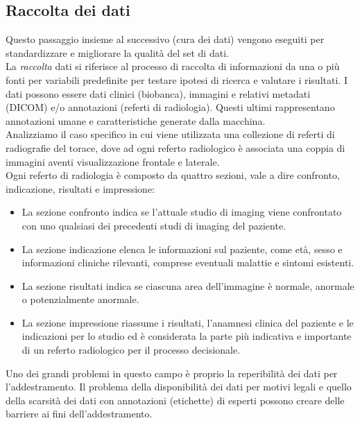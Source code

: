 \documentclass[12pt,a4paper]{report}
\begin{document}
\subsection{Raccolta dei dati}
Questo passaggio insieme al successivo (cura dei dati) vengono eseguiti per standardizzare e migliorare la qualità del set di dati.\\
La \emph{raccolta} dati si riferisce al processo di raccolta di informazioni da una o più fonti per variabili predefinite per testare ipotesi di ricerca e valutare i risultati. 
I dati possono essere dati clinici (biobanca), immagini e relativi metadati (DICOM) e/o annotazioni (referti di radiologia). Questi ultimi rappresentano annotazioni umane e caratteristiche generate dalla macchina.\\
Analizziamo il caso specifico in cui viene utilizzata una collezione di referti di radiografie del torace, dove ad ogni referto radiologico è associata una coppia di immagini aventi visualizzazione frontale e laterale.\\
Ogni referto di radiologia è composto da quattro sezioni, vale a dire confronto, indicazione, risultati e impressione:
\begin{itemize}
    \item La sezione confronto indica se l'attuale studio di imaging viene confrontato con uno qualsiasi dei precedenti studi di imaging del paziente.
    \item La sezione indicazione elenca le informazioni sul paziente, come età, sesso e informazioni cliniche rilevanti, comprese eventuali malattie e sintomi esistenti.
    \item La sezione risultati indica se ciascuna area dell'immagine è normale, anormale o potenzialmente anormale.
    \item La sezione impressione riassume i risultati, l'anamnesi clinica del paziente e le indicazioni per lo studio ed è considerata la parte più indicativa e importante di un referto radiologico per il processo decisionale.
\end{itemize}

Uno dei grandi problemi in questo campo è proprio la reperibilità dei dati per l’addestramento.
Il problema della disponibilità dei dati per motivi legali e quello della scarsità dei dati con annotazioni (etichette) di esperti possono creare delle barriere ai fini dell’addestramento.
\end{document}
